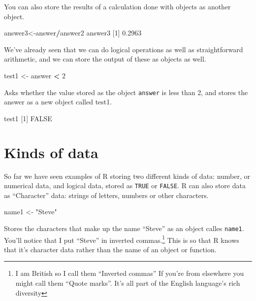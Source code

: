 \documentclass[
]{book}
\newenvironment{Shaded}{\begin{snugshade}}{\end{snugshade}}
\newcommand{\DecValTok}[1]{\textcolor[rgb]{0.00,0.00,0.81}{#1}}
\newcommand{\FloatTok}[1]{\textcolor[rgb]{0.00,0.00,0.81}{#1}}
\newcommand{\NormalTok}[1]{#1}
\newcommand{\OperatorTok}[1]{\textcolor[rgb]{0.81,0.36,0.00}{\textbf{#1}}}
\newcommand{\OtherTok}[1]{\textcolor[rgb]{0.56,0.35,0.01}{#1}}
\newcommand{\StringTok}[1]{\textcolor[rgb]{0.31,0.60,0.02}{#1}}
\begin{document}
You can also store the results of a calculation done with objects as another object.

\begin{Shaded}
\begin{Highlighting}[]
\NormalTok{answer3<-answer}\OperatorTok{/}\NormalTok{answer2}
\NormalTok{answer3}
\NormalTok{[}\DecValTok{1}\NormalTok{] }\FloatTok{0.2963}
\end{Highlighting}
\end{Shaded}

We've already seen that we can do logical operations as well as straightforward arithmetic, and we can store the output of these as objects as well.

\begin{Shaded}
\begin{Highlighting}[]
\NormalTok{test1 <-}\StringTok{ }\NormalTok{answer }\OperatorTok{<}\StringTok{ }\DecValTok{2}
\end{Highlighting}
\end{Shaded}

Asks whether the value stored as the object \texttt{answer} is less than 2, and stores the answer as a new object called test1.

\begin{Shaded}
\begin{Highlighting}[]
\NormalTok{test1}
\NormalTok{[}\DecValTok{1}\NormalTok{] }\OtherTok{FALSE}
\end{Highlighting}
\end{Shaded}

\hypertarget{kinds-of-data}{%
\section{Kinds of data}\label{kinds-of-data}}

So far we have seen examples of R storing two different kinds of data: number, or numerical data, and logical data, stored as \texttt{TRUE} or \texttt{FALSE}. R can also store data as ``Character'' data: strings of letters, numbers or other characters.

\begin{Shaded}
\begin{Highlighting}[]
\NormalTok{name1 <-}\StringTok{ "Steve"}
\end{Highlighting}
\end{Shaded}

Stores the characters that make up the name ``Steve'' as an object calles \texttt{name1}. You'll notice that I put ``Steve'' in inverted commas.\footnote{I am British so I call them ``Inverted commas'' If you're from elsewhere you might call them ``Quote marks''. It's all part of the English language's rich diversity} This is so that R knows that it's character data rather than the name of an object or function.
\end{document}
